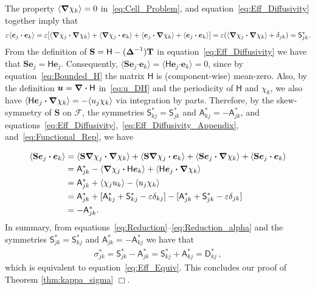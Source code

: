 \documentclass[leqno,onefignum,onetabnum]{siamltex1213}
\newcommand{\Tb}{\mathbf{T}}
\newcommand{\Sb}{\mathbf{S}}
\newcommand{\Fc}{\mathcal{F}}
\newcommand{\Dm}{\mathsf{D}}
\newcommand{\Hm}{\mathsf{H}}
\newcommand{\Sm}{\mathsf{S}}
\newcommand{\Am}{\mathsf{A}}
\newcommand\bDelta{\mbox{\boldmath${\Delta}$}}
\newcommand\bnabla{\mbox{\boldmath${\nabla}$}}
\providecommand\bcdot{\boldsymbol{\cdot}}
\newcommand{\vecu}{\boldsymbol{u}}
\newcommand{\vece}{\boldsymbol{e}}
\begin{document}
The property  $\langle\bnabla \chi_k\rangle=0$ in~\eqref{eq:Cell_Problem}, and
equation~\eqref{eq:Eff_Diffusivity} together imply that  
%
\begin{align}\label{eq:Reduction_kappa}
  \varepsilon\langle\vece _j\bcdot\vece _k\rangle=\varepsilon[\langle\bnabla \chi_j\bcdot\bnabla \chi_k\rangle
                   +\langle\bnabla \chi_j\bcdot\vece _k\rangle+\langle\vece _j\bcdot\bnabla \chi_k\rangle
                   +\langle\vece _j\bcdot\vece _k\rangle]
                   =\varepsilon(\langle\bnabla \chi_j\bcdot\bnabla \chi_k\rangle+\delta_{jk})
                   =\Sm^*_{jk}. 
\end{align}
%
From the definition of $\Sb=\Hm-(\bDelta^{-1})\Tb$ in
equation~\eqref{eq:Eff_Diffusivity} we have that 
$\Sb\vece _j=\Hm\vece _j$. Consequently,
$\langle\Sb\vece _j\bcdot\vece _k\rangle=\langle\Hm\vece _j\bcdot\vece _k\rangle=0$, since by 
equation~\eqref{eq:Bounded_H} the matrix $\Hm$ is (component-wise)
mean-zero. Also, by the definition $\vecu =\bnabla \bcdot\Hm$
in~\eqref{eq:u_DH} and the periodicity of $\Hm$ and $\chi_k$, we also
have 
$\langle\Hm\vece _j\bcdot\bnabla \chi_k\rangle=-\langle u_j\chi_k\rangle$ via integration by
parts. Therefore, by the skew-symmetry of $\Sb$ on $\Fc$, the
symmetries $\Sm^*_{kj}=\Sm^*_{jk}$ and $\Am^*_{kj}=-\Am^*_{jk}$, and
equations~\eqref{eq:Eff_Diffusivity},~\eqref{eq:Eff_Diffusivity_Appendix},
and~\eqref{eq:Functional_Rep}, we have 


%
\begin{align}\label{eq:Reduction_alpha}    
   \langle\Sb\vece _j\bcdot\vece _k\rangle&=\langle\Sb\bnabla \chi_j\bcdot\bnabla \chi_k\rangle
                       +\langle\Sb\bnabla \chi_j\bcdot\vece _k\rangle+\langle\Sb\vece _j\bcdot\bnabla \chi_k\rangle
                       +\langle\Sb\vece _j\bcdot\vece _k\rangle
                       \\
                       &=\Am^*_{jk}-\langle\bnabla \chi_j\bcdot\Hm\vece _k\rangle+\langle\Hm\vece _j\bcdot\bnabla \chi_k\rangle
                       \notag\\
                       &=\Am^*_{jk}+\langle\chi_ju_k\rangle-\langle u_j\chi_k\rangle
                       \notag\\
                       &=\Am^*_{jk}+[\Am^*_{kj}+\Sm^*_{kj}-\varepsilon\delta_{kj}]-[\Am^*_{jk}+\Sm^*_{jk}-\varepsilon\delta_{jk}]
                       \notag\\
                       &=-\Am^*_{jk}.
                       \notag
\end{align}
%
In summary, from
equations~\eqref{eq:Reduction}--\eqref{eq:Reduction_alpha} and the 
symmetries $\Sm^*_{jk}=\Sm^*_{kj}$ and $\Am^*_{jk}=-\Am^*_{kj}$ we have that 
%
\begin{align}\label{eq:Reduction_final}
  \sigma^*_{jk}=\Sm^*_{jk}-\Am^*_{jk}=\Sm^*_{kj}+\Am^*_{kj}=\Dm_{kj}^*\,,       
\end{align}
%
which is equivalent to equation~\eqref{eq:Eff_Equiv}. This concludes
our proof of Theorem \ref{thm:kappa_sigma} $\Box$.     
\end{document}

